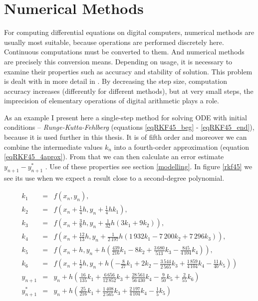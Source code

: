 \documentclass[english]{cls/fitthesis}
\newcommand{\ns}[1][]{
  y^{#1}_{n + 1}
}
\begin{document}
    \section{Numerical Methods}\label{numMethods}
      For computing differential equations on digital computers, numerical methods are usually most suitable,
      because operations are performed discretely here. Continuous computations must be converted to them.
      And numerical methods are precisely this conversion means.
      Depending on usage, it is necessary to examine their properties such as accuracy and stability of solution.
      This problem is dealt with in more detail in \cite{rektorys}. By decreasing the step size, computation accuracy increases
      (differently for different methods), but at very small steps, the imprecision of elementary operations of digital arithmetic plays a role.

      As an example I present here a single-step method for solving ODE with initial conditions -- \emph{Runge-Kutta-Fehlberg}
      (equations \ref{eqRKF45_beg} - \ref{eqRKF45_end}), because it is used further in this thesis. It is of fifth order and
      moreover we can combine the intermediate values $k_n$ into a fourth-order approximation (equation \ref{eqRKF45_4aprox}). From that we can
      then calculate an error estimate $ \ns - \ns[*] $ . Use of these properties see section \ref{modelling}. In figure
      \ref{rkf45} we see its use when we expect a result close to a second-degree polynomial.

      \begin{eqnarray}
        k_1 & = & f(x_n, y_n) , \label{eqRKF45_beg} \\
        k_2 & = & f(x_n + \frac{1}{4}h, y_n + \frac{1}{4}hk_1) , \\
        k_3 & = & f(x_n + \frac{3}{8}h, y_n + \frac{1}{32}h(3k_1 + 9k_2)) , \\
        k_4 & = & f(x_n + \frac{12}{13}h, y_n + \frac{1}{2\,197}h(1\,932k_1 - 7\,200k_2 + 7\,296k_3)) , \\
        k_5 & = & f(x_n + h, y_n + h(\frac{439}{216}k_1 - 8k_2 + \frac{3\,680}{513}k_3 - \frac{845}{4\,104}k_4)) , \\
        k_6 & = & f(x_n + \frac{1}{2}h, y_n + h(-\frac{8}{27}k_1 + 2k_2 - \frac{3\,544}{2\,565}k_3 +
                          \frac{1\,859}{4\,104}k_4 - \frac{11}{40}k_5)) \\
        \ns & = & y_n + h(\frac{16}{135}k_1 + \frac{6\,656}{12\,852}k_3 + \frac{28\,561}{56\,430}k_4
                        - \frac{9}{50}k_5 + \frac{2}{55}k_6) \label{eqRKF45_end} \\
        \ns[*] & = & y_n + h(\frac{25}{216}k_1 + \frac{1\,408}{2\,565}k_3 + \frac{2\,197}{4\,104}k_4 -
                          \frac{1}{5}k_5) \label{eqRKF45_4aprox}
      \end{eqnarray}
\end{document}
